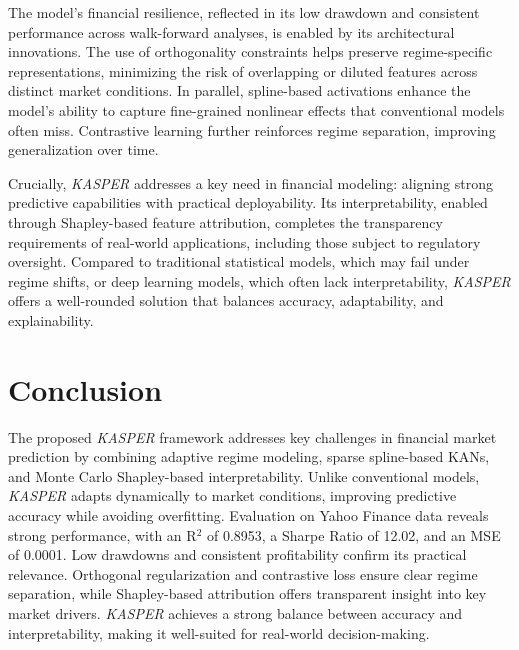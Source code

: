 \documentclass[conference,10pt]{IEEEtran}
\begin{document}
The model's financial resilience, reflected in its low drawdown and consistent performance across walk-forward analyses, is enabled by its architectural innovations. The use of orthogonality constraints helps preserve regime-specific representations, minimizing the risk of overlapping or diluted features across distinct market conditions. In parallel, spline-based activations enhance the model's ability to capture fine-grained nonlinear effects that conventional models often miss. Contrastive learning further reinforces regime separation, improving generalization over time.

Crucially, \textit{KASPER} addresses a key need in financial modeling: aligning strong predictive capabilities with practical deployability. Its interpretability, enabled through Shapley-based feature attribution, completes the transparency requirements of real-world applications, including those subject to regulatory oversight. Compared to traditional statistical models, which may fail under regime shifts, or deep learning models, which often lack interpretability, \textit{KASPER} offers a well-rounded solution that balances accuracy, adaptability, and explainability. 

\section{Conclusion} \label{sec5}  

The proposed \textit{KASPER} framework addresses key challenges in financial market prediction by combining adaptive regime modeling, sparse spline-based KANs, and Monte Carlo Shapley-based interpretability. Unlike conventional models, \textit{KASPER} adapts dynamically to market conditions, improving predictive accuracy while avoiding overfitting. Evaluation on Yahoo Finance data reveals strong performance, with an R$^2$ of 0.8953, a Sharpe Ratio of 12.02, and an MSE of 0.0001. Low drawdowns and consistent profitability confirm its practical relevance. Orthogonal regularization and contrastive loss ensure clear regime separation, while Shapley-based attribution offers transparent insight into key market drivers. \textit{KASPER} achieves a strong balance between accuracy and interpretability, making it well-suited for real-world decision-making. %




\end{document}
